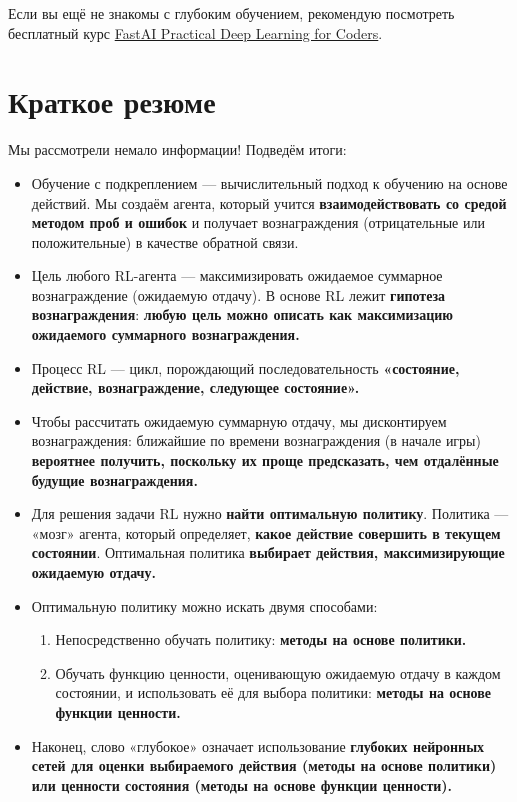 \documentclass[11pt,a4paper]{article}
\begin{document}

Если вы ещё не знакомы с глубоким обучением, рекомендую посмотреть бесплатный курс \href{https://course.fast.ai}{FastAI Practical Deep Learning for Coders}.

\section{Краткое резюме}\label{summary}

Мы рассмотрели немало информации! Подведём итоги:

\begin{itemize}
\item
  Обучение с подкреплением --- вычислительный подход к обучению на основе действий. Мы создаём агента, который учится \textbf{взаимодействовать со средой методом проб и ошибок} и получает вознаграждения (отрицательные или положительные) в качестве обратной связи.
\item
  Цель любого RL-агента --- максимизировать ожидаемое суммарное вознаграждение (ожидаемую отдачу). В основе RL лежит \textbf{гипотеза вознаграждения}: \textbf{любую цель можно описать как максимизацию ожидаемого суммарного вознаграждения.}
\item
  Процесс RL --- цикл, порождающий последовательность \textbf{«состояние, действие, вознаграждение, следующее состояние».}
\item
  Чтобы рассчитать ожидаемую суммарную отдачу, мы дисконтируем вознаграждения: ближайшие по времени вознаграждения (в начале игры) \textbf{вероятнее получить, поскольку их проще предсказать, чем отдалённые будущие вознаграждения.}
\item
  Для решения задачи RL нужно \textbf{найти оптимальную политику}. Политика --- «мозг» агента, который определяет, \textbf{какое действие совершить в текущем состоянии}. Оптимальная политика \textbf{выбирает действия, максимизирующие ожидаемую отдачу.}
\item
  Оптимальную политику можно искать двумя способами:

  \begin{enumerate}
  \def\labelenumi{\arabic{enumi}.}
  \tightlist
  \item
    Непосредственно обучать политику: \textbf{методы на основе политики.}
  \item
    Обучать функцию ценности, оценивающую ожидаемую отдачу в каждом состоянии, и использовать её для выбора политики: \textbf{методы на основе функции ценности.}
  \end{enumerate}
\item
  Наконец, слово «глубокое» означает использование \textbf{глубоких нейронных сетей для оценки выбираемого действия (методы на основе политики) или ценности состояния (методы на основе функции ценности).}
\end{itemize}
\end{document}
